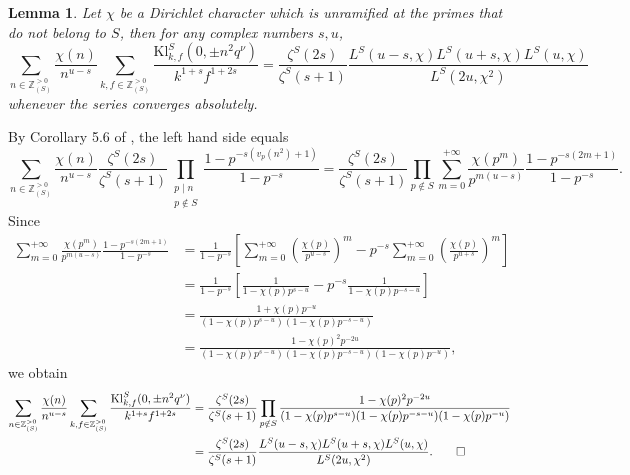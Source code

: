 \documentclass[10pt,oneside,reqno]{amsart}
\makeatletter
\newcommand\ZZ{\mathbb{Z}}
\newcommand\Kl{\mathrm{Kl}}
\newcommand\legendresymbol[2]{\genfrac{(}{)}{}{}{#1}{#2}}
\theoremstyle{THEOREM}
\newtheorem{lemma}[theorem]{Lemma}
\theoremstyle{DEFINITION}
\theoremstyle{EXERCISE}
\numberwithin{equation}{section}
\renewenvironment{proof}[1][\proofname]{\par
  \vspace{-6pt}
  \pushQED{\qed}
  \normalfont \topsep6\p@\@plus6\p@\relax
  \trivlist
  \item[\hskip\labelsep\rmfamily\bfseries
    #1\@addpunct{:}]\ignorespaces
}{
  \popQED\endtrivlist\@endpefalse
  \vspace{-6pt}
}
\makeatother
\begin{document}
\begin{lemma}\label{lem:kloostermandirichlet}
Let $\chi$ be a Dirichlet character which is unramified at the primes that do not belong to $S$, then for any complex numbers $s,u$,
\[
\sum_{n\in \ZZ_{(S)}^{>0}}\frac{\chi(n)}{n^{u-s}}\sum_{k,f\in \ZZ_{(S)}^{>0}}\frac{\Kl_{k,f}^S(0,\pm n^2q^\nu)}{k^{1+s}f^{1+2s}}=\frac{\zeta^S(2s)}{\zeta^S(s+1)} \frac{L^S(u-s,\chi)L^S(u+s,\chi)L^S(u,\chi)}{L^S(2u,\chi^2)}
\]
whenever the series converges absolutely. 
\end{lemma}
\begin{proof}
By Corollary 5.6 of \cite{cheng2025}, the left hand side equals
\[
\sum_{n\in \ZZ_{(S)}^{>0}}\frac{\chi(n)}{n^{u- s}}\frac{\zeta^S(2s)}{\zeta^S(s+1)}\prod_{\substack{p\mid n\\p\notin S}}\frac{1-p^{-s(v_p(n^2)+1)}}{1-p^{-s}}=\frac{\zeta^S(2s)}{\zeta^S(s+1)}\prod_{p\notin S}\sum_{m=0}^{+\infty}\frac{\chi(p^m)}{p^{m(u-s)}}\frac{1-p^{-s(2m+1)}}{1-p^{-s}}.
\]
Since
\begin{align*}
\sum_{m=0}^{+\infty}\frac{\chi(p^m)}{p^{m(u-s)}}\frac{1-p^{-s(2m+1)}}{1-p^{-s}}&= \frac{1}{1-p^{-s}}\left[\sum_{m=0}^{+\infty}\legendresymbol{\chi(p)}{p^{u-s}}^m-p^{-s}\sum_{m=0}^{+\infty} \legendresymbol{\chi(p)}{p^{u+s}}^m\right]\\
&=\frac{1}{1-p^{-s}}\left[\frac{1}{1-\chi(p)p^{s-u}}-p^{-s}\frac{1}{1-\chi(p)p^{-s-u}}\right]\\
&=\frac{1+\chi(p)p^{-u}}{(1-\chi(p)p^{s-u})(1-\chi(p)p^{-s-u})}\\\
&= \frac{1-\chi(p)^2p^{-2u}}{(1-\chi(p)p^{s-u})(1-\chi(p)p^{-s-u})(1-\chi(p)p^{-u})},
\end{align*}
we obtain
\begin{align*}
\sum_{n\in \ZZ_{(S)}^{>0}}\frac{\chi(n)}{n^{u-s}}\sum_{k,f\in \ZZ_{(S)}^{>0}}\frac{\Kl_{k,f}^S(0,\pm n^2q^\nu)}{k^{1+s}f^{1+2s}}&=\frac{\zeta^S(2s)}{\zeta^S(s+1)} \prod_{p\notin S} \frac{1-\chi(p)^2p^{-2u}}{(1-\chi(p)p^{s-u})(1-\chi(p)p^{-s-u})(1-\chi(p)p^{-u})}\\
&=\frac{\zeta^S(2s)}{\zeta^S(s+1)} \frac{L^S(u-s,\chi)L^S(u+s,\chi)L^S(u,\chi)}{L^S(2u,\chi^2)}.\qedhere
\end{align*}
\end{proof}
\end{document}
